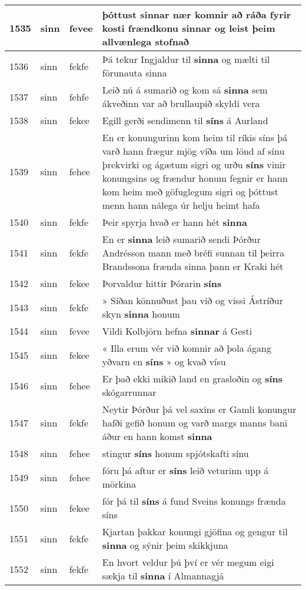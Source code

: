 \documentclass{article}
\begin{document}
\begin{longtable}{p{1cm}|p{1cm}|p{1cm}|p{13cm}}
\hline
1535&sinn&fevee&þóttust \textbf{sinnar} nær komnir að ráða fyrir kosti frændkonu sinnar og leist þeim allvænlega stofnað\\
\hline
1536&sinn&fekfe&Þá tekur Ingjaldur til \textbf{sinna} og mælti til förunauta sinna\\
\hline
1537&sinn&fehfe&Leið nú á sumarið og kom sá \textbf{sinna} sem ákveðinn var að brullaupið skyldi vera\\
\hline
1538&sinn&fekee&Egill gerði sendimenn til \textbf{síns} á Aurland\\
\hline
1539&sinn&fehee&En er konungurinn kom heim til ríkis síns þá varð hann frægur mjög víða um lönd af sínu þrekvirki og ágætum sigri og urðu \textbf{síns} vinir konungsins og frændur honum fegnir er hann kom heim með göfuglegum sigri og þóttust menn hann nálega úr helju heimt hafa\\
\hline
1540&sinn&fekfe&Þeir spyrja hvað er hann hét \textbf{sinna} \\
\hline
1541&sinn&fekfe&En er \textbf{sinna} leið sumarið sendi Þórður Andrésson mann með bréfi sunnan til þeirra Brandssona frænda sinna þann er Kraki hét\\
\hline
1542&sinn&fekee&Þorvaldur hittir Þórarin \textbf{síns} \\
\hline
1543&sinn&fekfe&» Síðan könnuðust þau við og vissi Ástríður skyn \textbf{sinna} honum\\
\hline
1544&sinn&fevee&Vildi Kolbjörn hefna \textbf{sinnar} á Gesti\\
\hline
1545&sinn&fekee&« Illa erum vér við komnir að þola ágang yðvarn en \textbf{síns} » og kvað vísu\\
\hline
1546&sinn&fehee&Er það ekki mikið land en grasloðin og \textbf{síns} skógarrunnar\\
\hline
1547&sinn&fekfe&Neytir Þórður þá vel saxins er Gamli konungur hafði gefið honum og varð margs manns bani áður en hann komst \textbf{sinna} \\
\hline
1548&sinn&fehee&stingur \textbf{síns} honum spjótskafti sínu\\
\hline
1549&sinn&fehee&fóru þá aftur er \textbf{síns} leið veturinn upp á mörkina\\
\hline
1550&sinn&fekee&fór þá til \textbf{síns} á fund Sveins konungs frænda síns\\
\hline
1551&sinn&fekfe&Kjartan þakkar konungi gjöfina og gengur til \textbf{sinna} og sýnir þeim skikkjuna\\
\hline
1552&sinn&fekfe&En hvort veldur þú því er vér megum eigi sækja til \textbf{sinna} í Almannagjá\\

\end{longtable}
\end{document}

